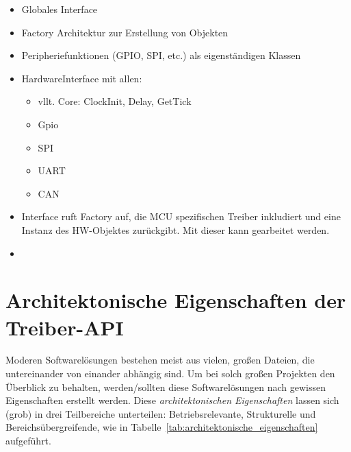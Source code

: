 \begin{itemize}
	\item Globales Interface
	\item Factory Architektur zur Erstellung von Objekten
	\item Peripheriefunktionen (GPIO, SPI, etc.) als eigenständigen Klassen
	\item HardwareInterface mit allen:
	\begin{itemize}
		\item vllt. Core: ClockInit, Delay, GetTick
		\item Gpio
		\item SPI
		\item UART
		\item CAN
	\end{itemize}
	\item Interface ruft Factory auf, die MCU spezifischen Treiber inkludiert und eine Instanz des HW-Objektes zurückgibt. Mit dieser kann gearbeitet werden.
	\item 
\end{itemize}






\section{Architektonische Eigenschaften der Treiber-API}
Moderen Softwarelösungen bestehen meist aus vielen, großen Dateien, die untereinander von einander abhängig sind.
Um bei solch großen Projekten den Überblick zu behalten, werden/sollten diese Softwarelösungen nach gewissen Eigenschaften erstellt werden.
Diese \emph{architektonischen Eigenschaften} lassen sich (grob) in drei Teilbereiche unterteilen: Betriebsrelevante, Strukturelle und Bereichsübergreifende, wie in Tabelle~\ref{tab:architektonische_eigenschaften} aufgeführt. %

